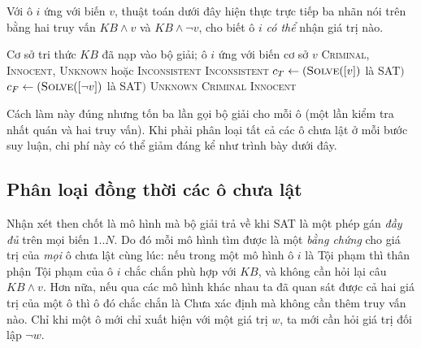 Với ô $i$ ứng với biến $v$, thuật toán dưới đây hiện thực trực tiếp ba nhãn nói trên bằng hai truy vấn $KB \land v$ và $KB \land \neg v$, cho biết ô $i$ \emph{có thể} nhận giá trị nào.

\begin{algorithm}[H]
\caption{Phân loại một ô \textsc{ClassifyCell}}
\label{alg:classify-cell}
\begin{algorithmic}[1]
\REQUIRE Cơ sở tri thức $KB$ đã nạp vào bộ giải; ô $i$ ứng với biến cơ sở $v$
\ENSURE \textsc{Criminal}, \textsc{Innocent}, \textsc{Unknown} hoặc \textsc{Inconsistent}
    \RETURN \textsc{Inconsistent} 
\ENDIF
\STATE $c_T \leftarrow (\textsc{Solve}([v])$ là SAT$)$ 
\STATE $c_F \leftarrow (\textsc{Solve}([\neg v])$ là SAT$)$ 
    \RETURN \textsc{Unknown}
    \RETURN \textsc{Criminal}
\ELSE
    \RETURN \textsc{Innocent}
\ENDIF
\end{algorithmic}
\end{algorithm}

Cách làm này đúng nhưng tốn ba lần gọi bộ giải cho mỗi ô (một lần kiểm tra nhất quán và hai truy vấn). Khi phải phân loại tất cả các ô chưa lật ở mỗi bước suy luận, chi phí này có thể giảm đáng kể như trình bày dưới đây.

\subsection{Phân loại đồng thời các ô chưa lật}
\label{subsec:phan-loai-dong-thoi}

Nhận xét then chốt là mô hình mà bộ giải trả về khi SAT là một phép gán \emph{đầy đủ} trên mọi biến $1..N$. Do đó mỗi mô hình tìm được là một \emph{bằng chứng} cho giá trị của \emph{mọi} ô chưa lật cùng lúc: nếu trong một mô hình ô $i$ là Tội phạm thì thân phận Tội phạm của ô $i$ chắc chắn phù hợp với $KB$, và không cần hỏi lại câu $KB \land v$. Hơn nữa, nếu qua các mô hình khác nhau ta đã quan sát được cả hai giá trị của một ô thì ô đó chắc chắn là Chưa xác định mà không cần thêm truy vấn nào. Chỉ khi một ô mới chỉ xuất hiện với một giá trị $w$, ta mới cần hỏi giá trị đối lập $\neg w$.

